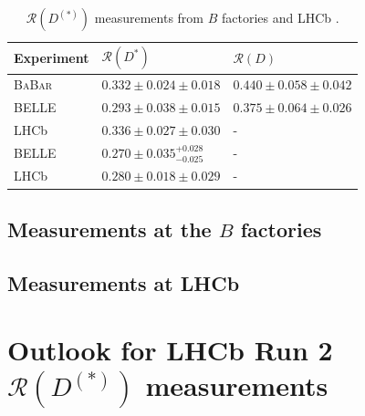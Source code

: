 \documentclass[12pt,letterpaper]{article}
\newcommand{\PRLrule}{
    \bigskip
    \noindent\makebox[\linewidth]{
        \resizebox{0.3333\linewidth}{1pt}{$\blacklozenge$}
    }
    \bigskip
}
\def\BaBar/{\textsc{BaBar}}
\def\RD/{\ensuremath{\mathcal{R}(D)}}
\def\RDst/{\ensuremath{\mathcal{R}(D^{*})}}
\def\RDDst/{\ensuremath{\mathcal{R}(D^{(*)})}}
\begin{document}
\begin{table}[ht]
    \centering
    \begin{tabular}{lll}
        \toprule
        Experiment  &  \RDst/                               &  \RD/                         \\
        \midrule
        \BaBar/     &  $0.332 \pm 0.024 \pm 0.018$          &  $0.440 \pm 0.058 \pm 0.042$  \\
        BELLE       &  $0.293 \pm 0.038 \pm 0.015$          &  $0.375 \pm 0.064 \pm 0.026$  \\
        LHCb        &  $0.336 \pm 0.027 \pm 0.030$          &  -                            \\
        BELLE       &  $0.270 \pm 0.035^{+0.028}_{-0.025}$  &  -                            \\
        LHCb        &  $0.280 \pm 0.018 \pm 0.029$          &  -                            \\
        \bottomrule
    \end{tabular}
    \caption{
        \RDDst/ measurements from $B$ factories and LHCb \cite{HFLAV:2019}.
    }
    \label{tab:results}
\end{table}

\subsection{Measurements at the $B$ factories} \label{sec:meas_bfactories}


\subsection{Measurements at LHCb} \label{sec:meas_lhcb}


\section{Outlook for LHCb Run 2 \RDDst/ measurements}



\PRLrule
\printbibliography
\end{document}
